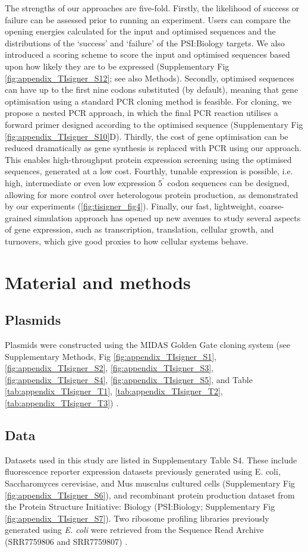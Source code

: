 The strengths of our approaches are five-fold. Firstly, the likelihood of success or failure can be assessed prior to running an experiment. Users can compare the opening energies calculated for the input and optimised sequences and the distributions of the ‘success’ and ‘failure’ of the PSI:Biology targets. We also introduced a scoring scheme to score the input and optimised sequences based upon how likely they are to be expressed (Supplementary Fig \ref{fig:appendix_TIsigner_S12}; see also Methods). Secondly, optimised sequences can have up to the first nine codons substituted (by default), meaning that gene optimisation using a standard PCR cloning method is feasible. For cloning, we propose a nested PCR approach, in which the final PCR reaction utilises a forward primer designed according to the optimised sequence \cite{Sambrook2001-ki} (Supplementary Fig \ref{fig:appendix_TIsigner_S10}D). Thirdly, the cost of gene optimisation can be reduced dramatically as gene synthesis is replaced with PCR using our approach. This enables high-throughput protein expression screening using the optimised sequences, generated at a low cost. Fourthly, tunable expression is possible, i.e. high, intermediate or even low expression $5^{\prime}$ codon sequences can be designed, allowing for more control over heterologous protein production, as demonstrated by our experiments (\ref{fig:tisigner_fig4}). Finally, our fast, lightweight, coarse-grained simulation approach has opened up new avenues to study several aspects of gene expression, such as transcription, translation, cellular growth, and turnovers, which give good proxies to how cellular systems behave.


\section{Material and methods}
\subsection{Plasmids}
Plasmids were constructed using the MIDAS Golden Gate cloning system (see Supplementary Methods, Fig \ref{fig:appendix_TIsigner_S1}, \ref{fig:appendix_TIsigner_S2}, \ref{fig:appendix_TIsigner_S3}, \ref{fig:appendix_TIsigner_S4}, \ref{fig:appendix_TIsigner_S5}, and Table \ref{tab:appendix_TIsigner_T1}, \ref{tab:appendix_TIsigner_T2}, \ref{tab:appendix_TIsigner_T3}) \cite{Van_Dolleweerd2018-sg}.

\subsection{Data}
Datasets used in this study are listed in Supplementary Table S4. These include fluorescence reporter expression datasets previously generated using E. coli, Saccharomyces cerevisiae, and Mus musculus cultured cells (Supplementary Fig \ref{fig:appendix_TIsigner_S6}), and recombinant protein production dataset from the Protein Structure Initiative: Biology (PSI:Biology; Supplementary Fig \ref{fig:appendix_TIsigner_S7}). Two ribosome profiling libraries previously generated using \textit{E. coli} were retrieved from the Sequence Read Archive (SRR7759806 and SRR7759807) \cite{Mohammad2019-if}.

